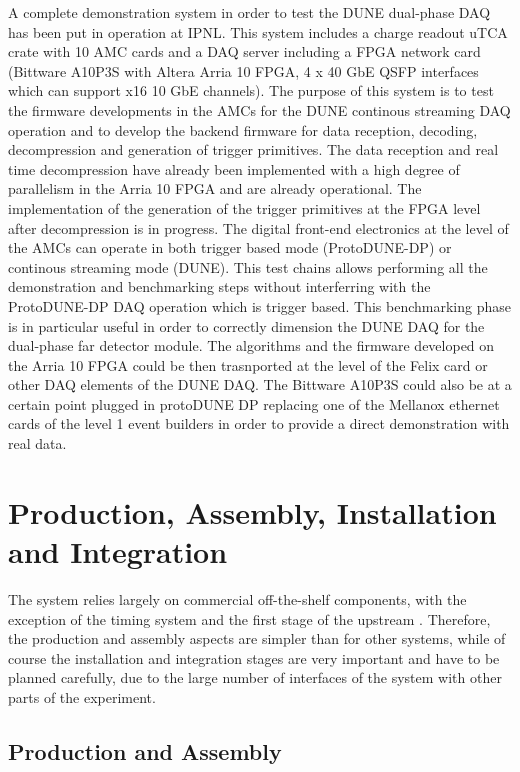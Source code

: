 A complete demonstration system in order to test the DUNE dual-phase DAQ has been put in operation at IPNL. This system
includes a charge readout uTCA crate with 10 AMC cards and a DAQ server including a FPGA network card (Bittware A10P3S with Altera Arria 10 FPGA,
4 x 40 GbE QSFP interfaces which can support  x16 10 GbE channels). The purpose of this system is to test the firmware developments in the AMCs for the DUNE continous streaming DAQ operation and  to develop the backend firmware for data reception, decoding, decompression and generation of trigger primitives. The data reception and real time decompression have already been implemented with a high degree of parallelism in the Arria 10 FPGA and are already operational. The implementation of the generation of the trigger primitives at the FPGA level after decompression is in progress. The digital front-end electronics at the level of the AMCs can operate in both trigger based mode (ProtoDUNE-DP) or continous streaming mode (DUNE). This test chains allows performing all the demonstration and benchmarking steps without interferring with the ProtoDUNE-DP DAQ operation which is trigger based. This benchmarking phase is in particular useful in order to correctly dimension the DUNE DAQ for the dual-phase far detector module. The algorithms and the firmware developed on the Arria 10 FPGA could be then trasnported at the level of the Felix card or other DAQ elements of the DUNE DAQ. The Bittware A10P3S could also be at a certain point plugged in protoDUNE DP replacing one of the Mellanox ethernet cards of the level 1 event builders in order to provide a direct demonstration with real data.


\section{Production, Assembly, Installation and Integration}
\label{sec:daq:production}

The  system relies largely on commercial off-the-shelf components, with the exception of the timing system and the first stage of the upstream .
Therefore, the production and assembly aspects are simpler than for other systems, while of course the installation and integration stages are very important and have to be planned carefully, due to the large number of interfaces of the  system with other parts of the experiment.

\subsection{Production and Assembly}
